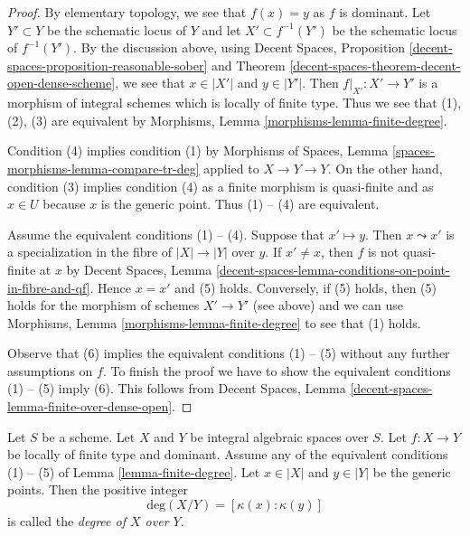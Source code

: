 \begin{proof}
By elementary topology, we see that $f(x) = y$ as $f$ is dominant.
Let $Y' \subset Y$ be the schematic locus of $Y$ and let
$X' \subset f^{-1}(Y')$ be the schematic locus of $f^{-1}(Y')$.
By the discussion above, using
Decent Spaces, Proposition \ref{decent-spaces-proposition-reasonable-sober} and
Theorem \ref{decent-spaces-theorem-decent-open-dense-scheme},
we see that $x \in |X'|$ and $y \in |Y'|$.
Then $f|_{X'} : X' \to Y'$ is a morphism of integral schemes
which is locally of finite type. Thus we see that (1), (2), (3)
are equivalent by Morphisms, Lemma \ref{morphisms-lemma-finite-degree}.

\medskip\noindent
Condition (4) implies condition (1) by
Morphisms of Spaces, Lemma \ref{spaces-morphisms-lemma-compare-tr-deg}
applied to $X \to Y \to Y$.
On the other hand, condition (3) implies condition (4) as
a finite morphism is quasi-finite and as $x \in U$ because $x$
is the generic point. Thus (1) -- (4) are equivalent.

\medskip\noindent
Assume the equivalent conditions (1) -- (4). Suppose that
$x' \mapsto y$. Then $x \leadsto x'$ is a specialization in the
fibre of $|X| \to |Y|$ over $y$. If $x' \not = x$, then $f$ is not
quasi-finite at $x$ by Decent Spaces, Lemma
\ref{decent-spaces-lemma-conditions-on-point-in-fibre-and-qf}.
Hence $x = x'$ and (5) holds. Conversely, if (5) holds, then
(5) holds for the morphism of schemes $X' \to Y'$ (see above)
and we can use
Morphisms, Lemma \ref{morphisms-lemma-finite-degree}
to see that (1) holds.

\medskip\noindent
Observe that (6) implies the equivalent conditions (1) -- (5)
without any further assumptions on $f$. To finish the proof
we have to show the equivalent conditions (1) -- (5) imply (6).
This follows from Decent Spaces, Lemma
\ref{decent-spaces-lemma-finite-over-dense-open}.
\end{proof}

\begin{definition}
\label{definition-degree}
Let $S$ be a scheme.
Let $X$ and $Y$ be integral algebraic spaces over $S$.
Let $f : X \to Y$ be locally of finite type and dominant.
Assume any of the equivalent conditions (1) -- (5) of
Lemma \ref{lemma-finite-degree}. Let $x \in |X|$ and $y \in |Y|$
be the generic points. Then the positive integer
$$
\text{deg}(X/Y) = [\kappa(x) : \kappa(y)]
$$
is called the {\it degree of $X$ over $Y$}.
\end{definition}

